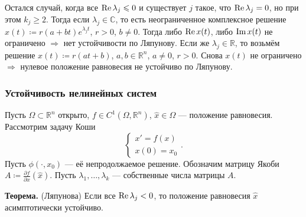 \begin{enumerate}
Остался случай, когда все $\operatorname{Re} \lambda_j \leqslant 0$ и существует $j$ такое, что $\operatorname{Re} \lambda_j = 0$, но при этом $k_j \ge 2$. Тогда если $\lambda_j \in \mathbb C$, то есть неограниченное комплексное решение $x(t) \coloneq r(a+bt)e^{\lambda_jt}$, $r > 0$, $b \ne 0$. Тогда либо $\operatorname{Re} x(t)$, либо $\operatorname{Im} x(t)$ не ограничено $\Rightarrow$ нет устойчивости по Ляпунову.
Если же $\lambda_j \in \mathbb R$, то возьмём решение $x(t) \coloneq r(at + b)$, $a, b \in \mathbb R^n$, $a \ne 0$, $r > 0$. Снова $x(t)$ не ограничено $\Rightarrow$ нулевое положение равновесия не устойчиво по Ляпунову.
\end{enumerate}

\QED

\subsubsection{Устойчивость нелинейных систем}
Пусть $\Omega \subset \mathbb{R}^n$ открыто, $f \in C^1(\Omega, \mathbb{R}^n)$, $\widehat{x} \in \Omega$ --- положение равновесия.
Рассмотрим задачу Коши
\[
\begin{cases}
    x' = f(x)\\
    x(0) = x_0
\end{cases}.
\]
Пусть $\phi(\cdot, x_0)$ --- её непродолжаемое решение. Обозначим матрицу Якоби $A \coloneq \frac{\partial f}{\partial x}(\widehat{x})$. Пусть $\lambda_1, \dots, \lambda_k$ --- собственные числа матрицы $A$.

\textbf{Теорема.} (Ляпунова) Если все $\operatorname{Re} \lambda_j < 0$, то положение равновесия $\widehat{x}$ асимптотически устойчиво.


